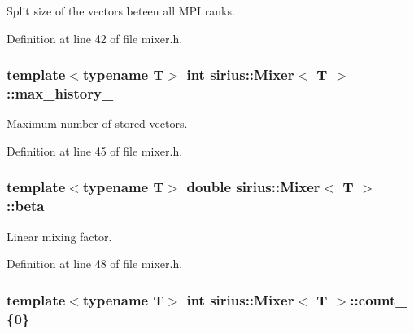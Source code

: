 Split size of the vectors beteen all M\+P\+I ranks. 



Definition at line 42 of file mixer.\+h.

\hypertarget{classsirius_1_1_mixer_ab7530cd633c6b0153ee3e2a482d42aa7}{}
\subsubsection[{max\+\_\+history\+\_\+}]{\setlength{\rightskip}{0pt plus 5cm}template$<$typename T$>$ int {\bf sirius\+::\+Mixer}$<$ T $>$\+::max\+\_\+history\+\_\+\hspace{0.3cm}{\ttfamily [protected]}}\label{classsirius_1_1_mixer_ab7530cd633c6b0153ee3e2a482d42aa7}


Maximum number of stored vectors. 



Definition at line 45 of file mixer.\+h.

\hypertarget{classsirius_1_1_mixer_a41a4d228e3a0bbf5e1ec7b91356fe4b0}{}
\subsubsection[{beta\+\_\+}]{\setlength{\rightskip}{0pt plus 5cm}template$<$typename T$>$ double {\bf sirius\+::\+Mixer}$<$ T $>$\+::beta\+\_\+\hspace{0.3cm}{\ttfamily [protected]}}\label{classsirius_1_1_mixer_a41a4d228e3a0bbf5e1ec7b91356fe4b0}


Linear mixing factor. 



Definition at line 48 of file mixer.\+h.

\hypertarget{classsirius_1_1_mixer_adced2a7404dfce163d13420a6a97fee9}{}
\subsubsection[{count\+\_\+}]{\setlength{\rightskip}{0pt plus 5cm}template$<$typename T$>$ int {\bf sirius\+::\+Mixer}$<$ T $>$\+::count\+\_\+ \{0\}\hspace{0.3cm}{\ttfamily [protected]}}\label{classsirius_1_1_mixer_adced2a7404dfce163d13420a6a97fee9}


